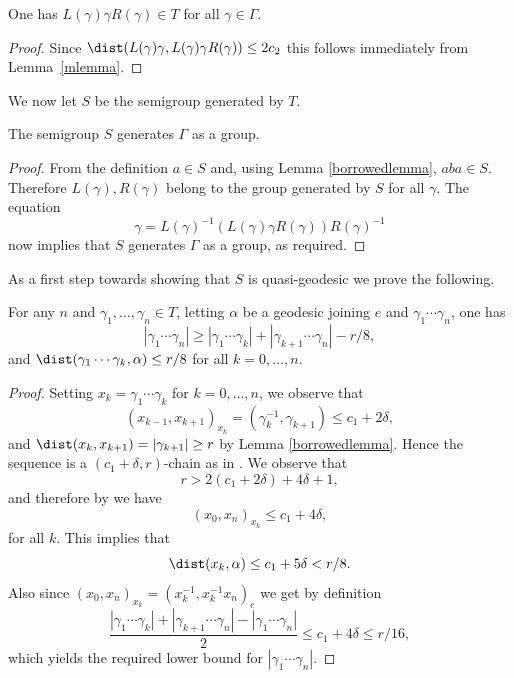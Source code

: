 \begin{lemma}
One has \(L(\gamma)\gamma R(\gamma) \in T\) for all \(\gamma \in \Gamma\).
\end{lemma}
\begin{proof}
Since \(\dist(L(\gamma)\gamma, L(\gamma)\gamma R(\gamma)) \le 2c_2\) this follows immediately from Lem\-ma~\ref{mlemma}.
\end{proof}

We now let \(S\) be the semigroup generated by \(T\).

\begin{lemma}
The semigroup \(S\) generates \(\Gamma\) as a group.
\end{lemma}
\begin{proof}
From the definition \(a \in S\) and, using Lemma \ref{borrowedlemma}, \(aba \in S\). Therefore \(L(\gamma),R(\gamma)\) belong to the group generated by \(S\) for all \(\gamma\).
The equation
\[
\gamma = L(\gamma)^{-1}\left(L(\gamma)\gamma R(\gamma) \right)R(\gamma)^{-1}
\]
now implies that \(S\) generates \(\Gamma\) as a group, as required.
\end{proof}

As a first step towards showing that \(S\) is quasi-geodesic we prove the following.

\begin{lemma}\label{boundeddistanelemma}
For any \(n\) and \(\gamma_1,\ldots, \gamma_n \in T\), letting \(\alpha\) be a geodesic joining \(e\) and \(\gamma_1\cdots \gamma_n\), one has\vspace*{-3pt}
\[
|\gamma_1\cdots\gamma_n| \ge |\gamma_1\cdots \gamma_k| + |\gamma_{k+1}\cdots \gamma_n| - r/8,
\]
and \(\dist(\gamma_1\cdots \gamma_k,\alpha) \le r/8\) for all \(k = 0,\ldots, n\).
\end{lemma}
\begin{proof}
Setting \(x_k = \gamma_1\cdots \gamma_k\) for \(k = 0,\ldots, n\), we observe that\vspace*{-3pt}
\[
(x_{k-1},x_{k+1})_{x_k} = (\gamma_{k}^{-1},\gamma_{k+1}) \le c_1 + 2\delta,
\]
and \(\dist(x_k,x_{k+1}) = |\gamma_{k+1}| \ge r\) by Lemma \ref{borrowedlemma}.
Hence the sequence is a \((c_1+\delta,r)\)-chain as in \cite{gouezel}.
We observe that\vspace*{-3pt}
\[
r > 2(c_1 + 2\delta) +4\delta + 1,
\]
and therefore by \cite[Lem.\,3.8]{gouezel} we have
\[
(x_0,x_n)_{x_k} \le c_1 + 4\delta,
\]
for all \(k\).
This implies that\vspace*{-3pt}
\[
\dist(x_k,\alpha) \le c_1 + 5\delta < r/8.
\]
Also since \((x_0,x_n)_{x_k} = (x_k^{-1},x_k^{-1}x_n)_e\) we get by definition
\[
\frac{|\gamma_1\cdots \gamma_k| + |\gamma_{k+1}\cdots \gamma_n| - |\gamma_1\cdots \gamma_n|}{2} \le c_1 + 4\delta \le r/16,
\]
which yields the required lower bound for \(|\gamma_1\cdots \gamma_n|\).
\end{proof}

